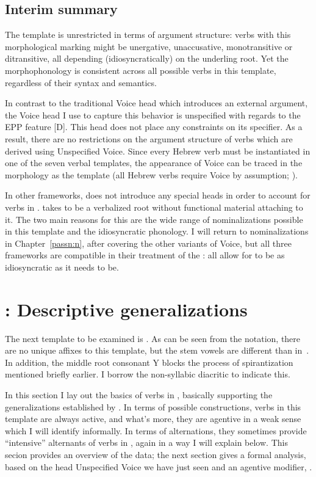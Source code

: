 {	\subsection{Interim summary}
The template {\tkal} is unrestricted in terms of argument structure: verbs with this morphological marking might be unergative, unaccusative, monotransitive or ditransitive, all depending (idiosyncratically) on the underling root. Yet the morphophonology is consistent across all possible verbs in this template, regardless of their syntax and semantics.

In contrast to the traditional Voice head which introduces an external argument, the Voice head I use to capture this behavior is unspecified with regards to the EPP feature [D]. This head does not place any constraints on its specifier. As a result, there are no restrictions on the argument structure of verbs which are derived using Unspecified Voice. Since every Hebrew verb must be instantiated in one of the seven verbal templates, the appearance of Voice can be traced in the morphology as the template {\tkal} (all Hebrew verbs require Voice by assumption; \citealt{arad05}).

In other frameworks, \cite{doron03} does not introduce any special heads in order to account for verbs in {\tkal}. \cite{borer13oup,borer15roots} takes {\tkal} to be a verbalized root without functional material attaching to it. The two main reasons for this are the wide range of nominalizations possible in this template and the idiosyncratic phonology. I will return to nominalizations in Chapter~\ref{passn:n}, after covering the other variants of Voice, but all three frameworks are compatible in their treatment of the {\tkal}: all allow for {\tkal} to be as idiosyncratic as it needs to be.

\section{\tpie: Descriptive generalizations} \label{voice:tpie}
The next template to be examined is {\tpie}. As can be seen from the notation, there are no unique affixes to this template, but the stem vowels are different than in~{\tkal}. In addition, the middle root consonant Y blocks the process of spirantization mentioned briefly earlier. I borrow the non-syllabic diacritic  to indicate this.

In this section I lay out the basics of verbs in {\tpie}, basically supporting the generalizations established by \cite{doron03}. In terms of possible constructions, verbs in this template are always active, and what's more, they are agentive in a weak sense which I will identify informally. In terms of alternations, they sometimes provide ``intensive'' alternants of verbs in {\tkal}, again in a way I will explain below. This secion provides an overview of the data; the next section gives a formal analysis, based on the head Unspecified Voice we have just seen and an agentive modifier, {\va}.

}
